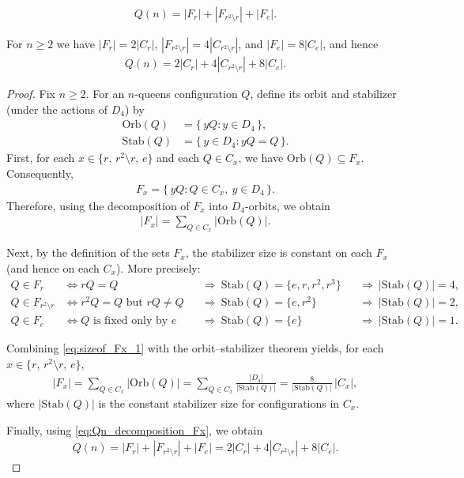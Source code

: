 \documentclass[10pt,a4paper]{amsart}
\begin{document}
\begin{align} \label{eq:Qn_decomposition_Fx}
    Q(n) = |F_r| + |F_{r^2 \setminus r}| + |F_e|.
\end{align}

\begin{theorem}\label{thm:Qn_decomposition}
For $n \geq 2$ we have $|F_r| = 2|C_r|$, $|F_{r^2 \setminus r}| = 4|C_{r^2 \setminus r}|$, and $|F_e| = 8|C_e|$, and hence
\begin{align}
    Q(n) = 2|C_r| + 4|C_{r^2 \setminus r}| + 8|C_e|.
\end{align}
\end{theorem}

\begin{proof}
Fix $n \geq 2$. For an $n$-queens configuration $Q$, define its orbit and stabilizer (under the actions of $D_4$) by
\begin{align}
    \mathrm{Orb}(Q)  &= \{\, yQ : y \in D_4 \,\},\\
    \mathrm{Stab}(Q) &= \{\, y \in D_4 : yQ = Q \,\}.
\end{align}
First, for each $x \in \{r,\, r^2 \setminus r,\, e\}$ and each $Q \in C_x$, we have $\mathrm{Orb}(Q) \subseteq F_x$. 
Consequently,
\begin{align}
    F_x = \{\, yQ : Q \in C_x,\ y \in D_4 \,\}.
\end{align}
Therefore, using the decomposition of $F_x$ into $D_4$-orbits, we obtain
\begin{align}\label{eq:sizeof_Fx_1}
    |F_x| = \sum_{Q \in C_x} |\mathrm{Orb}(Q)|.
\end{align}

Next, by the definition of the sets $F_x$, the stabilizer size is constant on each $F_x$ (and hence on each $C_x$). More precisely:
\begin{align}
    Q \in F_r
    &\iff rQ = Q
    &&\Rightarrow\ \mathrm{Stab}(Q) = \{e, r, r^2, r^3\}
    &&\Rightarrow\ |\mathrm{Stab}(Q)| = 4, \\
    Q \in F_{r^2 \setminus r}
    &\iff r^2Q = Q \text{ but } rQ \neq Q
    &&\Rightarrow\ \mathrm{Stab}(Q) = \{e, r^2\}
    &&\Rightarrow\ |\mathrm{Stab}(Q)| = 2, \\
    Q \in F_e
    &\iff \text{$Q$ is fixed only by $e$}
    &&\Rightarrow\ \mathrm{Stab}(Q) = \{e\}
    &&\Rightarrow\ |\mathrm{Stab}(Q)| = 1.
\end{align}

Combining \eqref{eq:sizeof_Fx_1} with the orbit--stabilizer theorem yields, for each $x \in \{r,\, r^2 \setminus r,\, e\}$,
\begin{align}
    |F_x|
    = \sum_{Q \in C_x} |\mathrm{Orb}(Q)|
    = \sum_{Q \in C_x} \frac{|D_4|}{|\mathrm{Stab}(Q)|}
    = \frac{8}{|\mathrm{Stab}(Q)|}\,|C_x|,
\end{align}
where $|\mathrm{Stab}(Q)|$ is the constant stabilizer size for configurations in $C_x$.

Finally, using \eqref{eq:Qn_decomposition_Fx}, we obtain
\begin{align}
    Q(n)
    = |F_r| + |F_{r^2 \setminus r}| + |F_e|
    = 2|C_r| + 4|C_{r^2 \setminus r}| + 8|C_e|.
\end{align}
\end{proof}
\end{document}

